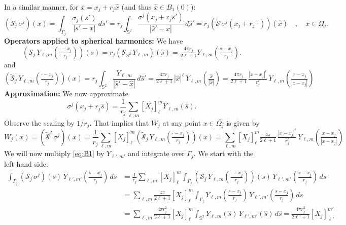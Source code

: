 In a similar manner, for $x = x_j +r_j \hat x$ (and thus $\hat x\in B_1(0)$):
\[
	(\tilde{\mathcal{S}}_j \,  \sigma^j) (x)
	= \int_{\Gamma_j} \frac{\sigma_j(s')}{|s'-x|} \, ds'
	= r_j\int_{\mathbb S^2} \frac{\sigma^j\left(x_j +r_j  \hat s'\right)}{\left |\hat s'-\hat x\right|} \, d\hat s'
	= r_j (\tilde{\mathcal{S}} \,  \sigma^j(x_j +r_j \cdot )) (\hat x)
	 \quad , \quad x \in \Omega_j.
\]
{\bf Operators applied to spherical harmonics:}
We have
\[
	\left({\mathcal{S}}_j \,  Y_{\ell,m}\left(\tfrac{\cdot - x_j}{r_j}\right)\right) (s)
	= 
	r_j({\mathcal{S}}_{\mathbb S^2} \,  Y_{\ell,m}) (\hat s)
	= 
	\tfrac{4 \pi r_j}{2\ell+1}  Y_{\ell,m} \left(\tfrac{s - x_j}{r_j}\right).
\]
and
\[
	\left(\tilde {\mathcal{S}}_j \,  Y_{\ell,m}\left(\tfrac{\cdot - x_j}{r_j}\right)\right) (x)
	=
	r_j \int_{\mathbb S^2} \frac{Y_{\ell,m}}{\left |\hat s'-\hat x\right|} \, d\hat s'
	=
	\tfrac{4 \pi r_j}{2\ell+1} \, |\hat x|^\ell \, Y_{\ell,m} \left(\tfrac{\hat x}{|\hat x|}\right)
	=
	\tfrac{4 \pi r_j}{2\ell+1} \, \tfrac{|x-x_j|^\ell}{r_j^\ell} \, Y_{\ell,m} \left(\tfrac{x-x_j}{|x-x_j|}\right)
\]
{\bf Approximation:}
We now approximate
\[
	\sigma^j(x_j+r_j \hat s) = \frac{1}{r_j} \sum_{\ell,m} [X_j]_\ell^m Y_{\ell,m} (\hat s).
\]
Observe the scaling by $1/r_j$.
That implies that $W_j$ at any point $x\in\overline{\Omega_j}$ is given by
\[
	W_j(x)
	=
	(\tilde{\mathcal{S}}^j \,  \sigma^j) (x)
	=
	 \frac{1}{r_j} \sum_{\ell,m} [X_j]_\ell^m\left(\tilde{\mathcal{S}}_j \,  Y_{\ell,m}\left(\tfrac{\cdot-x_j}{r_j}\right)\right) (x)
	=
	\sum_{\ell,m} [X_j]_\ell^m\tfrac{4 \pi }{2\ell+1} \, \tfrac{|x-x_j|^\ell}{r_j^\ell} \, Y_{\ell,m} \left(\tfrac{x-x_j}{|x-x_j|}\right)
\] 
We will now multiply \eqref{eq:B1} by $Y_{\ell',m'}$ and integrate over $\Gamma_j$. We start with the left hand side:
\begin{align*}
	\int_{\Gamma_j} ({\mathcal{S}}_j \,  \sigma^j) (s)  \, Y_{\ell',m'}\left(\tfrac{s-x_j}{r_j}\right) \, ds
	&=
	\frac{1}{r_j} \sum_{\ell,m} [X_j]_\ell^m \int_{\Gamma_j} \left({\mathcal{S}}_j \, Y_{\ell,m}\left(\tfrac{\cdot - x_j}{r_j}\right)\right) (s)  \, Y_{\ell',m'}\left(\tfrac{s-x_j}{r_j}\right) \, ds
	\\
	&=  \sum_{\ell,m} \tfrac{4 \pi }{2\ell+1} [X_j]_\ell^m \int_{\Gamma_j} Y_{\ell,m}\left(\tfrac{s - x_j}{r_j}\right)  \, Y_{\ell',m'}\left(\tfrac{s-x_j}{r_j}\right) \, ds
	\\
	&=  \sum_{\ell,m} \tfrac{4 \pi r_j^2}{2\ell+1}  [X_j]_\ell^m \int_{\mathbb S^2} Y_{\ell,m}(\hat s)  \, Y_{\ell',m'} (\hat s) \, d\hat s
	= \tfrac{4 \pi r_j^2}{2\ell'+1}  [X_j]_{\ell'}^{m'}
\end{align*}
